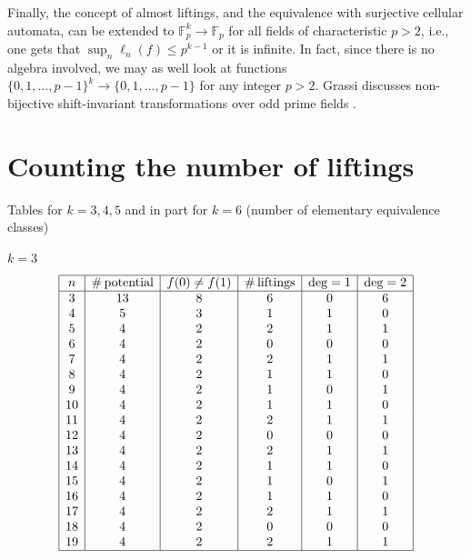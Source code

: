 \documentclass[11pt,english,a4paper]{amsart}
\theoremstyle{plain}
\theoremstyle{definition}
\theoremstyle{remark}
\newcommand{\F}{\mathbb{F}}
\begin{document}


Finally, the concept of almost liftings, and the equivalence with surjective cellular automata, can be extended to $\F_p^k\to\F_p$ for all fields of characteristic $p>2$, i.e., one gets that $\sup_n\ell_n(f)\leq p^{k-1}$ or it is infinite. In fact, since there is no algebra involved, we may as well look at functions $\{0,1,\dotsc, p-1\}^k\to\{0,1,\dotsc, p-1\}$ for any integer $p>2$. Grassi discusses non-bijective shift-invariant transformations over odd prime fields \cite{Grassi}.




\newpage
    
	\appendix
	
	\section{Counting the number of liftings}\label{liftings}
	
	Tables for $k=3,4,5$ and in part for $k=6$ (number of elementary equivalence classes)

    $k=3$
	\[
	\begin{array}{|c|c|c|c|c|c|} \hline
		n & \#\,\text{potential} & f(0) \neq f(1) & \#\,\text{liftings} & \deg = 1 & \deg = 2 \\ \hline
		3 & 13 & 8 & 6 & 0 & 6 \\
		4 & 5 & 3 & 1 & 1 & 0 \\
		5 & 4 & 2 & 2 & 1 & 1 \\
		6 & 4 & 2 & 0 & 0 & 0 \\
		7 & 4 & 2 & 2 & 1 & 1 \\
		8 & 4 & 2 & 1 & 1 & 0 \\
		9 & 4 & 2 & 1 & 0 & 1 \\
		10 & 4 & 2 & 1 & 1 & 0 \\
		11 & 4 & 2 & 2 & 1 & 1 \\
		12 & 4 & 2 & 0 & 0 & 0 \\
		13 & 4 & 2 & 2 & 1 & 1 \\
		14 & 4 & 2 & 1 & 1 & 0 \\
		15 & 4 & 2 & 1 & 0 & 1 \\
		16 & 4 & 2 & 1 & 1 & 0 \\
		17 & 4 & 2 & 2 & 1 & 1 \\
		18 & 4 & 2 & 0 & 0 & 0 \\
		19 & 4 & 2 & 2 & 1 & 1 \\ \hline
	\end{array}
	\]
\end{document}
